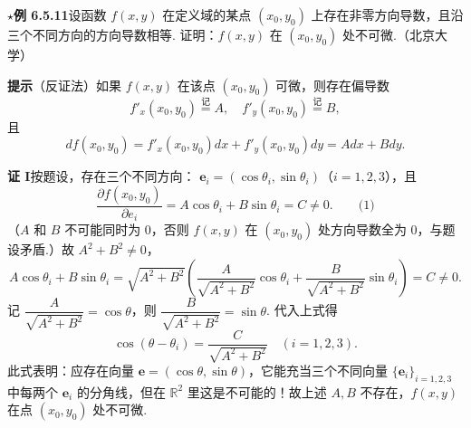 \documentclass[UTF8,12pt,a4paper,fontset=fandol]{ctexart}
\begin{document}
\noindent\textbf{\ensuremath{\star}例 6.5.11}\quad 设函数 $f(x,y)$ 在定义域的某点 $(x_0,y_0)$ 上存在非零方向导数，且沿三个不同方向的方向导数相等. 证明：$f(x,y)$ 在 $(x_0,y_0)$ 处不可微.（北京大学）

\noindent\textbf{提示}\quad （反证法）如果 $f(x,y)$ 在该点 $(x_0,y_0)$ 可微，则存在偏导数
\[
  f'_x(x_0,y_0)\overset{\text{记}}{=}A,\quad
  f'_y(x_0,y_0)\overset{\text{记}}{=}B,
\]
且
\[
  df(x_0,y_0)=f'_x(x_0,y_0)dx+f'_y(x_0,y_0)dy=Adx+Bdy.
\]

\noindent\textbf{证 I}\quad 按题设，存在三个不同方向：
$\mathbf e_i=(\cos\theta_i,\sin\theta_i)$（$i=1,2,3$），且
\[
  \frac{\partial f(x_0,y_0)}{\partial e_i}
  =
  A\cos\theta_i+B\sin\theta_i=C\ne0. \qquad\text{(1)}
\]
（$A$ 和 $B$ 不可能同时为 $0$，否则 $f(x,y)$ 在 $(x_0,y_0)$ 处方向导数全为 $0$，与题设矛盾.）故 $A^2+B^2\ne0$，
\[
  A\cos\theta_i+B\sin\theta_i
  =
  \sqrt{A^2+B^2}\left(
  \frac A{\sqrt{A^2+B^2}}\cos\theta_i+
  \frac B{\sqrt{A^2+B^2}}\sin\theta_i
  \right)
  =C\ne0.
\]
记 $\dfrac A{\sqrt{A^2+B^2}}=\cos\theta$，则
$\dfrac B{\sqrt{A^2+B^2}}=\sin\theta$. 代入上式得
\[
  \cos(\theta-\theta_i)=\frac C{\sqrt{A^2+B^2}}\quad(i=1,2,3).
\]
此式表明：应存在向量 $\mathbf e=(\cos\theta,\sin\theta)$，它能充当三个不同向量
$\{\mathbf e_i\}_{i=1,2,3}$ 中每两个 $\mathbf e_i$ 的分角线，但在 $\mathbb R^2$ 里这是不可能的！故上述 $A,B$ 不存在，$f(x,y)$ 在点 $(x_0,y_0)$ 处不可微.
\end{document}
